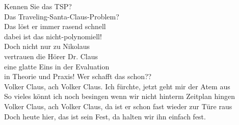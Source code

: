 \documentclass[11pt,a5paper]{article}
\begin{document}
			Kennen Sie das TSP? \\
			Das Traveling-Santa-Claus-Problem? \\
			Das löst er immer rasend schnell \\
			dabei ist das nicht-polynomiell! \\
			Doch nicht nur zu Nikolaus \\
			vertrauen die Hörer Dr. Claus \\
			eine glatte Eins in der Evaluation \\
			in Theorie und Praxis! Wer schafft das schon?? \\
			Volker Claus, ach Volker Claus. Ich fürchte, jetzt geht mir der Atem aus \\
			So vieles könnt ich noch besingen wenn wir nicht hinterm Zeitplan hingen \\
			Volker Claus, ach Volker Claus, da ist er schon fast wieder zur Türe raus \\
			Doch heute hier, das ist sein Fest, da halten wir ihn einfach fest. \\
			
		
\end{document}
